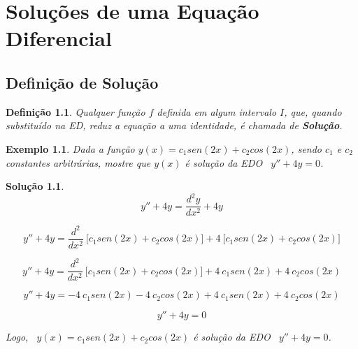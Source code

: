 \documentclass[12pt, a4paper]{book}
\newtheorem{defi}{Definição}[subsection]
\newtheorem{ex}{Exemplo}[subsection]
\newtheorem{sol}{Solução}[subsection]
\begin{document}
	\chapter{Soluções de uma Equação Diferencial}
	
	\section{Definição de Solução}
	
	\begin{defi}
		Qualquer função $f$ definida em algum intervalo $I$, que, quando substituído na ED, reduz a equação a uma identidade, é chamada de \textbf{Solução}. 
	\end{defi}

	\begin{ex}
		Dada a função $y(x) = c_{1} sen(2x) + c_{2} cos(2x)$, sendo $c_{1}$ e $c_{2}$ constantes arbitrárias, mostre que $y(x)$ é solução da EDO \ $y''+4y = 0$.
	\end{ex} 
	
	\begin{sol}
		$$y'' + 4y = \frac{d^{2}y}{dx^{2}} + 4y$$
		
		$$y'' + 4y = \frac{d^{2}}{dx^{2}} \ \Big[c_{1} sen(2x) + c_{2} cos(2x)\Big] + 4 \ \Big[c_{1} sen(2x) + c_{2} cos(2x)\Big]$$
		
		$$y'' + 4y = \frac{d^{2}}{dx^{2}} \ \Big[c_{1} sen(2x) + c_{2} cos(2x)\Big] + 4 \ c_{1} sen(2x) + 4 \ c_{2} cos(2x)$$
		
		$$y'' + 4y = -4 \ c_{1} sen(2x) - 4 \ c_{2} cos(2x) + 4 \ c_{1} sen(2x) + 4 \ c_{2} cos(2x)$$
		
		$$y'' + 4y = 0$$
		
		Logo, \ $y(x) = c_{1} sen(2x) + c_{2} cos(2x)$ é solução da EDO \ $y''+4y = 0$.
	\end{sol}
	
	
\end{document}
